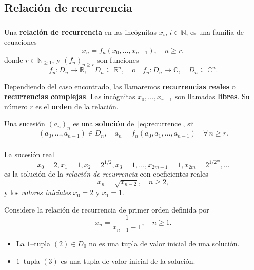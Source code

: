 \subsection{Relación de recurrencia}

\begin{frame}
\frametitle{\subsecname}

\begin{definition}
	Una \textbf{relación de recurrencia} en las incógnitas $x_{i}$, $i\in\mathds{N}$, es una familia de ecuaciones
		\begin{equation}\label{eq:recurrence}
			x_{n}=f_{n}\left(x_{0},\ldots,x_{n-1}\right),\quad n\geq r,
		\end{equation}
	donde $r\in\mathds{N}_{\geq1}$, y ${\left(f_{n}\right)}_{n\geq r}$ son funciones \[ f_{n}\colon D_{n}\rightarrow\mathds{R},\quad D_{n}\subseteq\mathds{R}^{n},\quad\text{o}\quad f_{n}\colon D_{n}\rightarrow\mathds{C},\quad D_{n}\subseteq\mathds{C}^{n}. \]

	Dependiendo del caso encontrado, las llamaremos \textbf{recurrencias reales} o \textbf{recurrencias complejas}. Las incógnitas $x_{0},\ldots,x_{r-1}$ son llamadas \textbf{libres}. Su número $r$ es el \textbf{orden} de la relación.
\end{definition}

\begin{definition}
	Una sucesión ${\left(a_{n}\right)}_{n}$ es una \textbf{solución} de~\eqref{eq:recurrence}, sii
		\begin{equation*}
		\left(a_{0},\ldots,a_{n-1}\right)\in D_{n},\quad a_{n}=f_{n}\left(a_{0},a_{1},\ldots,a_{n-1}\right)\quad\forall\,n\geq r.
		\end{equation*}
\end{definition}
\end{frame}

\begin{frame}
\frametitle{\subsecname}

\begin{example}
	La sucesión real \[ x_{0}=2, x_{1}=1, x_{2}=2^{1/2}, x_{3}=1, \ldots, x_{2m-1}=1 ,x_{2m}=2^{1/2^{m}}, \ldots \] es la solución de la \emph{relación de recurrencia} con coeficientes reales \[ x_{n}=\sqrt{x_{n-2}},\quad n\geq2, \] y los \emph{valores iniciales} $x_{0}=2$ y $x_{1}=1$.
\end{example}

\begin{example}
	Considere la relación de recurrencia de primer orden definida por \[ x_{n}=\frac{1}{x_{n-1}-1},\quad n\geq1.\]
	\begin{itemize}[topsep=0pt]
		\item La $1$--tupla $\left(2\right)\in D_{0}$ \alert{no es una tupla de valor inicial de una solución}.
		\item $1$--tupla $\left(3\right)$ \alert{es una tupla de valor inicial de la solución}.
	\end{itemize}
\end{example}
\end{frame}

